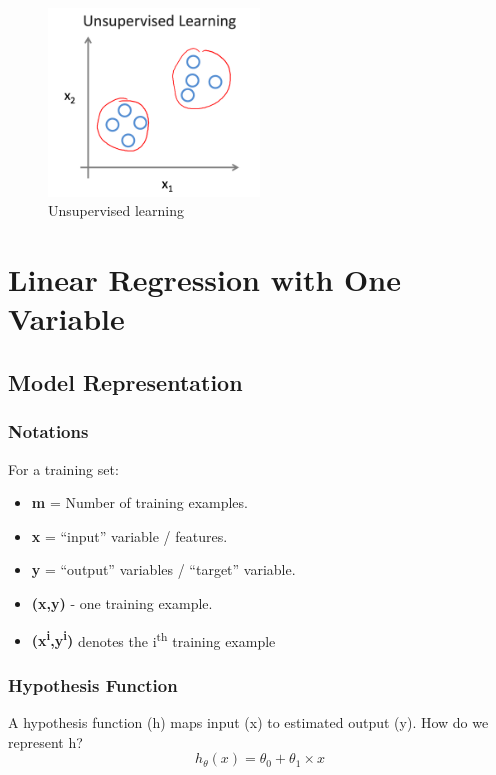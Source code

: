 \documentclass[letter]{article}
\begin{document}
    \begin{figure}[h]
        \centering
        \includegraphics[width=0.5\textwidth]{image/unsupervised-learning.png}
        \caption{Unsupervised learning}
        \label{fig:unsupervised-learning}
    \end{figure}
\section{Linear Regression with One Variable}
    \subsection{Model Representation}
        \subsubsection{Notations}
            For a training set:
           \begin{itemize}
               \item \textbf{m} = Number of training examples.
               \item \textbf{x} = ``input'' variable / features.
               \item \textbf{y} = ``output'' variables / ``target'' variable.
               \item \textbf{(x,y)} - one training example.
               \item \textbf{(x\textsuperscript{i},y\textsuperscript{i})} denotes the i\textsuperscript{th} training example 

           \end{itemize}

        \subsubsection{Hypothesis Function}
        
           A hypothesis function (h) maps input (x) to estimated output (y).
           How do we represent h?
           \begin{equation}
               h_{\theta} (x) = \theta_{0} +\theta_{1} \times x
               \label{eq:hypothesis}
           \end{equation}
\end{document}
